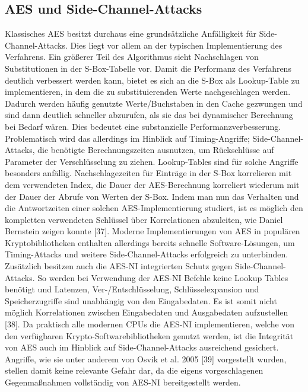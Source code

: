 \documentclass[conference,10pt,a4paper,twocolumn]{IEEEtran}
\begin{document}
\subsection{AES und Side-Channel-Attacks}
Klassisches AES besitzt durchaus eine grundsätzliche Anfälligkeit für Side-Channel-Attacks. Dies liegt vor allem an der typischen Implementierung des Verfahrens. Ein größerer Teil des Algorithmus sieht Nachschlagen von Substitutionen in der S-Box-Tabelle vor. Damit die Performanz des Verfahrens deutlich verbessert werden kann, bietet es sich an die S-Box als Lookup-Table zu implementieren, in dem die zu substituierenden Werte nachgeschlagen werden. Dadurch werden häufig genutzte Werte/Buchstaben in den Cache gezwungen und sind dann deutlich schneller abzurufen, als sie das bei dynamischer Berechnung bei Bedarf wären. Dies bedeutet eine substanzielle Performanzverbesserung. 
\newline 
Problematisch wird das allerdings im Hinblick auf Timing-Angriffe; Side-Channel-Attacks, die benötigte Berechnungszeiten ausnutzen, um Rückschlüsse auf Parameter der Verschlüsselung zu ziehen. Lookup-Tables sind für solche Angriffe besonders anfällig. Nachschlagezeiten für Einträge in der S-Box korrelieren mit dem verwendeten Index, die Dauer der AES-Berechnung korreliert wiederum mit der Dauer der Abrufe von Werten der S-Box. Indem man nun das Verhalten und die Antwortzeiten einer solchen AES-Implementierung studiert, ist es möglich den kompletten verwendeten Schlüssel über Korrelationen abzuleiten, wie Daniel Bernstein zeigen konnte [37]. \linebreak
Moderne Implementierungen von AES in populären Kryptobibliotheken enthalten allerdings bereits schnelle Software-Lösungen, um Timing-Attacks und weitere Side-Channel-Attacks erfolgreich zu unterbinden. Zusätzlich besitzen auch die AES-NI integrierten Schutz gegen Side-Channel-Attacks. So werden bei Verwendung der AES-NI Befehle keine Lookup Tables benötigt und Latenzen, Ver-/Entschlüsselung, Schlüsselexpansion und Speicherzugriffe sind unabhängig von den Eingabedaten. Es ist somit nicht möglich Korrelationen zwischen Eingabedaten und Ausgabedaten aufzustellen [38]. Da praktisch alle modernen CPUs die AES-NI implementieren, welche von den verfügbaren Krypto-Softwarebibliotheken genutzt werden, ist die Integrität von AES auch im Hinblick auf Side-Channel-Attacks ausreichend gesichert. Angriffe, wie sie unter anderem von Osvik et al. 2005 [39] vorgestellt wurden, stellen damit keine relevante Gefahr dar, da die eigens vorgeschlagenen Gegenmaßnahmen vollständig von AES-NI bereitgestellt werden.
\end{document}
